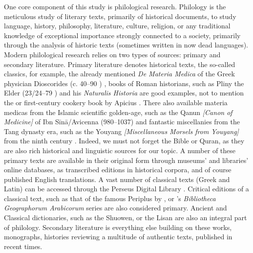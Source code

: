 One core component of this study is philological research. Philology is the meticulous study of literary texts, primarily of historical documents, to study language, history, philosophy, literature, culture, religion, or any traditional knowledge of exceptional importance strongly connected to a society, primarily through the analysis of historic texts (sometimes written in now dead languages). Modern philological research relies on two types of sources: primary and secondary literature. Primary literature denotes historical texts, the so-called classics, for example, the already mentioned \textit{De Materia Medica} of the Greek physician Dioscorides (c. 40--90 \AD{}) \autocite{dioscorides_materia_2005}, books of Roman historians, such as Pliny the Elder (23/24--79 \AD{}) and his \textit{Naturalis Historia} \autocite{pliny_the_elder_natural_1855} are good examples, not to mention the or first-century cookery book by Apicius \autocite{apicius_apicius_1977}. There also available \glspl{materia medica} from the Islamic scientific golden-age, such as the \gls{Qanun} \textit{[Canon of Medicine]} of Ibn Sīnā/Avicenna (980--1037) \autocite{ibn_sina_-qanun_1329} and fantastic miscellanies from the Tang dynasty era, such as the \gls{Youyang} \textit{[Miscellaneous Morsels from Youyang]} from the ninth century \autocite{yyzz}. Indeed, we must not forget the Bible or Quran, as they are also rich historical and linguistic sources for our topic. A number of these primary texts are available in their original form through museums' and libraries' online databases, as transcribed editions in historical corpora, and of course published English translations. A vast number of classical texts (Greek and Latin) can be accessed through the Perseus Digital Library \autocite{crane_perseus_nodate}. Critical editions of a classical text, such as that of the famous \gls{Periplus} by \textcite{casson_periplus_1989}, or \textcite{de_goeje_bibliotheca_1870}'s \textit{Bibliotheca Geographorum Arabicorum} series are also considered primary. Ancient and Classical dictionaries, such as the \gls{Shuowen}, or the \gls{Lisan} are also an integral part of philology. Secondary literature is everything else building on these works, monographs, histories reviewing a multitude of authentic texts, published in recent times.




